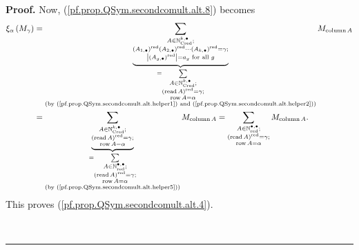 \documentclass
[numbers=enddot,12pt,final,onecolumn,notitlepage,abstracton]{scrartcl}%
\theoremstyle{definition}
\newenvironment{proof}[1][Proof]{\noindent\textbf{#1.} }{\ \rule{0.5em}{0.5em}}
\let\sumnonlimits\sum
\renewcommand{\sum}{\sumnonlimits\limits}
\begin{document}
\begin{proof}
Now, (\ref{pf.prop.QSym.secondcomult.alt.8}) becomes%
\begin{align*}
\xi_{\alpha}\left(  M_{\gamma}\right)   &  =\underbrace{\sum_{\substack{A\in
\mathbb{N}_{\operatorname*{Cred}}^{k,\bullet};\\\left(  A_{1,\bullet}\right)
^{\operatorname*{red}}\left(  A_{2,\bullet}\right)  ^{\operatorname*{red}%
}\cdots\left(  A_{k,\bullet}\right)  ^{\operatorname*{red}}=\gamma
;\\\left\vert \left(  A_{g,\bullet}\right)  ^{\operatorname*{red}}\right\vert
=a_{g}\text{ for all }g}}}_{\substack{=\sum_{\substack{A\in\mathbb{N}%
_{\operatorname*{Cred}}^{k,\bullet}\text{;}\\\left(  \operatorname*{read}%
A\right)  ^{\operatorname*{red}}=\gamma\text{;}\\\operatorname*{row}A=\alpha
}}\\\text{(by (\ref{pf.prop.QSym.secondcomult.alt.helper1}) and
(\ref{pf.prop.QSym.secondcomult.alt.helper2}))}}}M_{\operatorname*{column}A}\\
&  =\underbrace{\sum_{\substack{A\in\mathbb{N}_{\operatorname*{Cred}%
}^{k,\bullet}\text{;}\\\left(  \operatorname*{read}A\right)
^{\operatorname*{red}}=\gamma\text{;}\\\operatorname*{row}A=\alpha}%
}}_{\substack{=\sum_{\substack{A\in\mathbb{N}_{\operatorname*{red}}%
^{\bullet,\bullet}\text{;}\\\left(  \operatorname*{read}A\right)
^{\operatorname*{red}}=\gamma\text{;}\\\operatorname*{row}A=\alpha
}}\\\text{(by (\ref{pf.prop.QSym.secondcomult.alt.helper5}))}}%
}M_{\operatorname*{column}A}=\sum_{\substack{A\in\mathbb{N}%
_{\operatorname*{red}}^{\bullet,\bullet}\text{;}\\\left(  \operatorname*{read}%
A\right)  ^{\operatorname*{red}}=\gamma\text{;}\\\operatorname*{row}A=\alpha
}}M_{\operatorname*{column}A}.
\end{align*}
This proves (\ref{pf.prop.QSym.secondcomult.alt.4}).


\end{proof}
\end{document}
